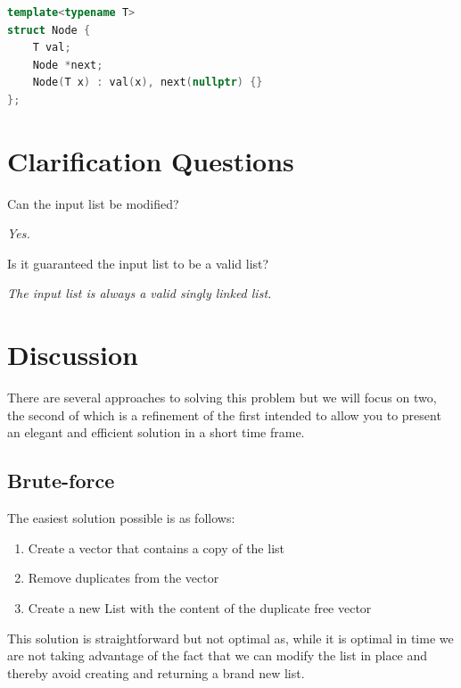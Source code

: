 \begin{lstlisting}[language=c++, caption=Singly Linked list definition,label=list:delete_duplicates_list:linked_list]
template<typename T>
struct Node {
	T val;
	Node *next;
	Node(T x) : val(x), next(nullptr) {}
};
\end{lstlisting}

\section{Clarification Questions}

\begin{QandA}
	\item \begin{questionitem} \begin{question} Can the input list be modified?  \end{question} 	 
    \begin{answered}
		\textit{Yes.}
	\end{answered} \end{questionitem}

	\item \begin{questionitem} \begin{question} Is it guaranteed the input list to be a valid list?  \end{question} 	 
		\begin{answered}
			\textit{The input list is always a valid singly linked list.}
		\end{answered} \end{questionitem}
	
\end{QandA}

\section{Discussion}
\label{delete_duplicates_list:sec:discussion}
There are several approaches to solving this problem but we will focus on two, the second of which is a refinement of the first intended to allow you to present an elegant and efficient solution in a short time frame.

\subsection{Brute-force}
\label{delete_duplicates_list:sec:bruteforce}
The easiest solution possible is as follows:
\begin{enumerate}
	\item Create a vector that contains a copy of the list
	\item Remove duplicates from the vector
	\item Create a new List with the content of the duplicate free vector
\end{enumerate}
This solution is straightforward but not optimal as, while it is optimal in time we are not taking advantage of the fact that we can modify the list in place and thereby avoid creating and returning a brand new list.  


